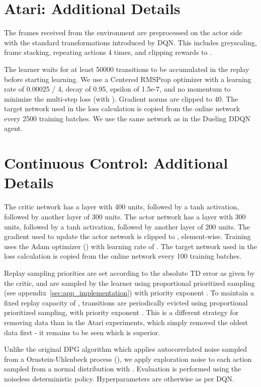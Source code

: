 \documentclass{article} \PassOptionsToPackage{usenames,dvipsnames}{xcolor}
\begin{document}
\section{Atari: Additional Details}
The frames received from the environment are preprocessed on the actor side with the standard transformations introduced by DQN. This includes greyscaling, frame stacking, repeating actions 4 times, and clipping rewards to .

The learner waits for at least 50000 transitions to be accumulated in the replay before starting learning. We use a Centered RMSProp optimizer with a learning rate of 0.00025 / 4, decay of 0.95, epsilon of 1.5e-7, and no momentum to minimize the multi-step loss (with ). Gradient norms are clipped to 40. The target network used in the loss calculation is copied from the online network every 2500 training batches. We use the same network as in the Dueling DDQN agent.

\section{Continuous Control: Additional Details}

The critic network has a layer with 400 units, followed by a tanh activation, followed by another layer of 300 units. The actor network has a layer with 300 units, followed by a tanh activation, followed by another layer of 200 units. The gradient used to update the actor network is clipped to , element-wise.  Training uses the Adam optimizer (\cite{kingma2014adam}) with learning rate of . The target network used in the loss calculation is copied from the online network every 100 training batches.

Replay sampling priorities are set according to the absolute TD error as given by the critic, and are sampled by the learner using proportional prioritized sampling (see appendix~\ref{sec:app_implementation}) with priority exponent . To maintain a fixed replay capacity of , transitions are periodically evicted using proportional prioritized sampling, with priority exponent . This is a different strategy for removing data than in the Atari experiments, which simply removed the oldest data first - it remains to be seen which is superior.

Unlike the original DPG algorithm which applies autocorrelated noise sampled from a Ornstein-Uhlenbeck process (\cite{uhlenbeck1930theory}), we apply exploration noise to each action sampled from a normal distribution with . Evaluation is performed using the noiseless deterministic policy. Hyperparameters are otherwise as per DQN.
\end{document}
